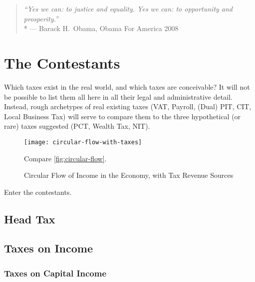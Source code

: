 

\begin{quote}
	\emph{``Yes we can:
	to justice and equality.
	Yes we can:
	to opportunity and prosperity.''}
	\\*
	--- Barack H.\ Obama, Obama For America 2008
\end{quote}

\section{The Contestants}
	\label{sec:contestants}
Which taxes exist in the real world, and which taxes are conceivable?
It will not be possible to list them all here in all their legal and administrative detail.
Instead, rough archetypes of real existing taxes (VAT, Payroll, (Dual) PIT, CIT, Local Business Tax) will serve to compare them to the three hypothetical (or rare) taxes suggested (PCT, Wealth Tax, NIT).



\begin{figure}[htbp]
	\centering
	\texttt{[image: circular-flow-with-taxes]}
	\caption[Circular Flow in the Economy, with Taxes]{Circular Flow of Income in the Economy, with Tax Revenue Sources}
	\begin{flushleft}
		\scriptsize{Compare \autoref{fig:circular-flow}.}
		
	\end{flushleft}
	\label{fig:circular-flow-with-taxes}
\end{figure}

Enter the contestants.

\subsection{Head Tax}

\subsection{Taxes on Income}

\subsubsection{Taxes on Capital Income}

